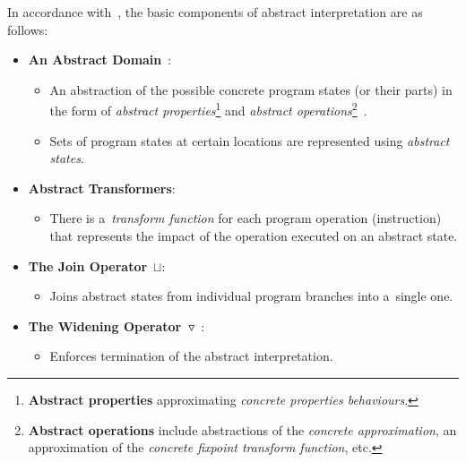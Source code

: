 In accordance with~\cite{savAI, harmimBP}, the basic
components of abstract interpretation are as follows:
\begin{itemize}
    \item
        \textbf{An Abstract Domain}~\cite{AICousotWeb}:

        \begin{itemize}
            \item
                An abstraction of the possible concrete program states
                (or their parts) in the form of \emph{abstract
                properties}\footnote{\textbf{Abstract properties}
                approximating \emph{concrete properties behaviours}.}
                and \emph{abstract operations}\footnote{\textbf{Abstract
                operations} include abstractions of the \emph{concrete
                approximation}, an approximation of the \emph{concrete
                fixpoint transform function},
                etc.}~\cite{AIBasedFormalMethodsCousot}.

            \item
                Sets of program states at certain locations are represented
                using \emph{abstract states}.
        \end{itemize}

    \item
        \textbf{Abstract Transformers}:

        \begin{itemize}
            \item
                There is a~\emph{transform function} for each program
                operation (instruction) that represents the impact
                of the operation executed on an abstract state.
        \end{itemize}

    \item
        \textbf{The Join Operator}~$ \sqcup $:

        \begin{itemize}
            \item
                Joins abstract states from individual program branches into
                a~single one.
        \end{itemize}

    \item
        \textbf{The Widening
        Operator~$ \triangledown $}~\cite{programAnalysisNielson,
        wideningNarrowingCousot, savAI}:

        \begin{itemize}
            \item
                Enforces termination of the abstract interpretation.


\end{itemize}
\end{itemize}
